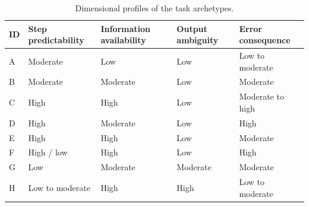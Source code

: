 \begin{table}[htbp]
\centering
\caption[Dimensional profiles of the task archetypes]{Dimensional profiles of the task archetypes.}
\label{tab:app-archetypes}
\renewcommand{\baselinestretch}{1}
\small
\setlength{\tabcolsep}{4pt}
\renewcommand{\arraystretch}{1.08}
\begin{tabular}{>{\raggedright\arraybackslash}p{} >{\raggedright\arraybackslash}p{} >{\raggedright\arraybackslash}p{} >{\raggedright\arraybackslash}p{} >{\raggedright\arraybackslash}p{}}
\toprule
\textbf{ID} & \textbf{Step predictability} & \textbf{Information availability} & \textbf{Output ambiguity} & \textbf{Error consequence} \\
\midrule
A & Moderate & Low & Low & Low to moderate \\
\addlinespace[2.5pt]
B & Moderate & Moderate & Low & Moderate \\
\addlinespace[2.5pt]
C & High & High & Low & Moderate to high \\
\addlinespace[2.5pt]
D & High & Moderate & Low & High \\
\addlinespace[2.5pt]
E & High & High & Low & Moderate \\
\addlinespace[2.5pt]
F & High / low & High & Low & High \\
\addlinespace[2.5pt]
G & Low & Moderate & Moderate & Moderate \\
\addlinespace[2.5pt]
H & Low to moderate & High & High & Low to moderate \\
\bottomrule
\end{tabular}
\end{table}


